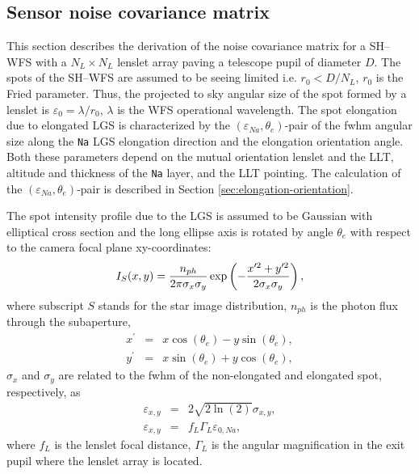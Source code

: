 \subsection{Sensor noise covariance matrix}
\label{subsec:sh-wfs-noise-covariance}

\mbox{}

This section describes the derivation of the noise covariance matrix for a
SH--WFS with a $N_L\times N_L$ lenslet array paving a telescope pupil of
diameter $D$.
The spots of the SH--WFS are assumed to be seeing
limited i.e. $r_0<D/N_L$, $r_0$ is the Fried parameter. Thus, the projected to
sky angular size of the spot formed by a lenslet is
$\varepsilon_0=\lambda/r_0$, $\lambda$ is the WFS operational wavelength.
The spot elongation due to elongated LGS is characterized by the
$(\varepsilon_{Na},\theta_{e})$-pair of the fwhm angular size
along the \texttt{Na} LGS elongation direction and the elongation
orientation angle. Both these parameters depend on the mutual orientation
lenslet and the LLT, altitude and thickness of the \texttt{Na} layer, and the
LLT pointing. The calculation of the $(\varepsilon_{Na},\theta_{e})$-pair is
described in Section \ref{sec:elongation-orientation}.

The spot intensity profile due to the LGS is
assumed to be Gaussian with elliptical cross section and the long ellipse axis
is rotated by angle $\theta_{e}$ with respect to the camera focal plane
xy-coordinates:
\def\nph{n_{ph}}
\begin{equation}
  \label{eq:2}
  I_{S}(x,y) = { \nph \over 2\pi \sigma_x\sigma_y }
  \exp\left( - { x^{\prime 2} + y^{\prime 2} \over 2\sigma_x\sigma_y}\right),
\end{equation}
where subscript $S$ stands for the star image distribution,
$\nph$ is the photon flux through the subaperture,
\def\vr{\bm{r}}
\def\vre{\bm{r_e}}
\begin{eqnarray}
  \label{eq:3}
  x^{\prime} &=& x\cos(\theta_e) - y\sin(\theta_e), \\
  y^{\prime} &=& x\sin(\theta_e) + y\cos(\theta_e),
\end{eqnarray}
$\sigma_x$ and $\sigma_y$ are related to the fwhm of the non-elongated and
elongated spot, respectively, as
\begin{eqnarray}
  \label{eq:6}
  \varepsilon_{x,y} &=& 2\sqrt{2\ln(2)}\sigma_{x,y}, \\
  \varepsilon_{x,y} &=& f_{L} \Gamma_{L} \varepsilon_{0,Na},
\end{eqnarray}
where $f_{L}$ is the lenslet focal distance, $\Gamma_{L}$ is the angular
magnification in the exit pupil where the lenslet array is located.

